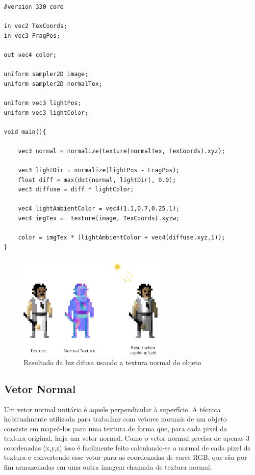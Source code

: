\documentclass[12pt, 
openright, 
oneside, 
a4paper,    
brazil]{facom-ufu-abntex2}
\begin{document}
\begin{lstlisting}[caption=Fragment Shader com luz ambiente e difusa]
#version 330 core

in vec2 TexCoords;
in vec3 FragPos;  

out vec4 color;

uniform sampler2D image;
uniform sampler2D normalTex;

uniform vec3 lightPos; 
uniform vec3 lightColor;

void main(){

	vec3 normal = normalize(texture(normalTex, TexCoords).xyz);

	vec3 lightDir = normalize(lightPos - FragPos);
	float diff = max(dot(normal, lightDir), 0.0);
	vec3 diffuse = diff * lightColor;
	
	vec4 lightAmbientColor = vec4(1.1,0.7,0.25,1);
	vec4 imgTex =  texture(image, TexCoords).xyzw;
	
	color = imgTex * (lightAmbientColor + vec4(diffuse.xyz,1));
}
\end{lstlisting}



\begin{figure}[H]
	\centering
	\includegraphics[width=20em]{imagens/normalTextureExample.png}
	\caption{Resultado da luz difusa usando a textura normal do objeto}
\end{figure}

\subsection{Vetor Normal}

Um vetor normal unitário é aquele perpendicular à superfície. A técnica habitualmente utilizada para trabalhar com vetores normais de um objeto consiste em mapeá-los para uma textura de forma que, para cada pixel da textura original, haja um vetor normal. Como o vetor normal precisa de apenas 3 coordenadas (x,y,z) isso é facilmente feito calculando-se a normal de cada pixel da textura e convertendo esse vetor para as coordenadas de cores RGB, que são por fim armazenadas em uma outra imagem chamada de textura normal.
\end{document}
